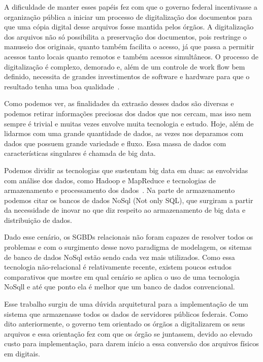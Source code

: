 A dificuldade de manter esses papéis fez com que o governo federal incentivasse a organização pública a iniciar um processo de digitalização dos documentos para que uma cópia digital desse arquivos fosse mantida pelos órgãos. A digitalização dos arquivos não só possibilita a preservação dos documentos, pois restringe o manuseio dos originais, quanto também facilita o acesso, já que passa a permitir acessos tanto locais quanto remotos e também acessos simultâneos. O processo de digitalização é complexo, demorado e, além de um controle de work flow bem definido, necessita de grandes investimentos de software e hardware para que o resultado tenha uma boa qualidade~\cite{arqConarq}.

Como podemos ver, as finalidades da extrasão desses dados são diversas e podemos retirar informações preciosas dos dados que nos cercam, mas isso nem sempre é trivial e muitas vezes envolve muita tecnologia e estudo. Hoje, além de lidarmos com uma grande quantidade de dados, as vezes nos deparamos com dados que possuem grande variedade e fluxo. Essa massa de dados com características singulares é chamada de big data.

Podemos dividir as tecnologias que sustentam big data em duas: as envolvidas com análise dos dados, como Hadoop e MapReduce e tecnologias de armazenamento e processamento dos dados~\cite{ibmvcsabeoqebigdata}. Na parte de armazenamento podemos citar os bancos de dados NoSql (Not only SQL), que surgiram a partir da necessidade de inovar no que diz respeito ao armazenamento de big data e distribuição de dados.

Dado esse cenário, os SGBDs relacionais não foram capazes de resolver todos os problemas e com o surgimento desse novo paradigma de modelagem, os sitemas de banco de dados NoSql estão sendo cada vez mais utilizados. Como essa tecnologia não-relacional é relativamente recente, existem poucos estudos comparativos que mostre em qual cenário se aplica o uso de uma tecnologia NoSqll e até que ponto ela é melhor que um banco de dados convencional.

Esse trabalho surgiu de uma dúvida arquitetural para a implementação de um sistema que armazenasse todos os dados de servidores públicos federais. Como dito anteriormente, o governo tem orientado os órgãos a digitalizarem os seus arquivos e essa orientação fez com que os órgão se juntassem, devido ao elevado custo para implementação, para darem início a essa conversão dos arquivos físicos em digitais.


